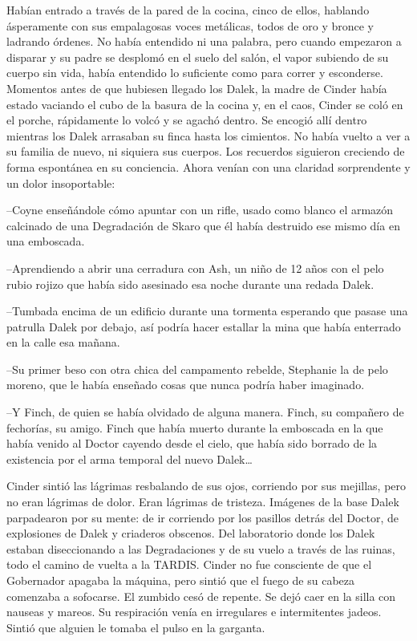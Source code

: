 Habían entrado a través de la pared de la cocina, cinco de ellos, hablando ásperamente con sus empalagosas voces metálicas, todos de oro y bronce y ladrando órdenes. No había entendido ni una palabra, pero cuando empezaron a disparar y su padre se desplomó en el suelo del salón, el vapor subiendo de su cuerpo sin vida, había entendido lo suficiente como para correr y esconderse. 
Momentos antes de que hubiesen llegado los Dalek, la madre de Cinder había estado vaciando el cubo de la basura de la cocina y, en el caos, Cinder se coló en el porche, rápidamente lo volcó y se agachó dentro. Se encogió allí dentro mientras los Dalek arrasaban su finca hasta los cimientos. No había vuelto a ver a su familia de nuevo, ni siquiera sus cuerpos. 
Los recuerdos siguieron creciendo de forma espontánea en su conciencia. Ahora venían con una claridad sorprendente y un dolor insoportable: 

--Coyne enseñándole cómo apuntar con un rifle, usado como blanco el armazón calcinado de una Degradación de Skaro que él había destruido ese mismo día en una emboscada. 

--Aprendiendo a abrir una cerradura con Ash, un niño de 12 años con el pelo rubio rojizo que había sido asesinado esa noche durante una redada Dalek. 

--Tumbada encima de un edificio durante una tormenta esperando que pasase una patrulla Dalek por debajo, así podría hacer estallar la mina que había enterrado en la calle esa mañana. 

--Su primer beso con otra chica del campamento rebelde, Stephanie la de pelo moreno, que le había enseñado cosas que nunca podría haber imaginado. 

--Y Finch, de quien se había olvidado de alguna manera. Finch, su compañero de fechorías, su amigo. Finch que había muerto durante la emboscada en la que había venido al Doctor cayendo desde el cielo, que había sido borrado de la existencia por el arma temporal del nuevo Dalek… 

Cinder sintió las lágrimas resbalando de sus ojos, corriendo por sus mejillas, pero no eran lágrimas de dolor. Eran lágrimas de tristeza. 
Imágenes de la base Dalek parpadearon por su mente: de ir corriendo por los pasillos detrás del Doctor, de explosiones de Dalek y criaderos obscenos. Del laboratorio donde los Dalek estaban diseccionando a las Degradaciones y de su vuelo a través de las ruinas, todo el camino de vuelta a la TARDIS. 
Cinder no fue consciente de que el Gobernador apagaba la máquina, pero sintió que el fuego de su cabeza comenzaba a sofocarse. El zumbido cesó de repente. Se dejó caer en la silla con nauseas y mareos. Su respiración venía en irregulares e intermitentes jadeos. 
Sintió que alguien le tomaba el pulso en la garganta. 

